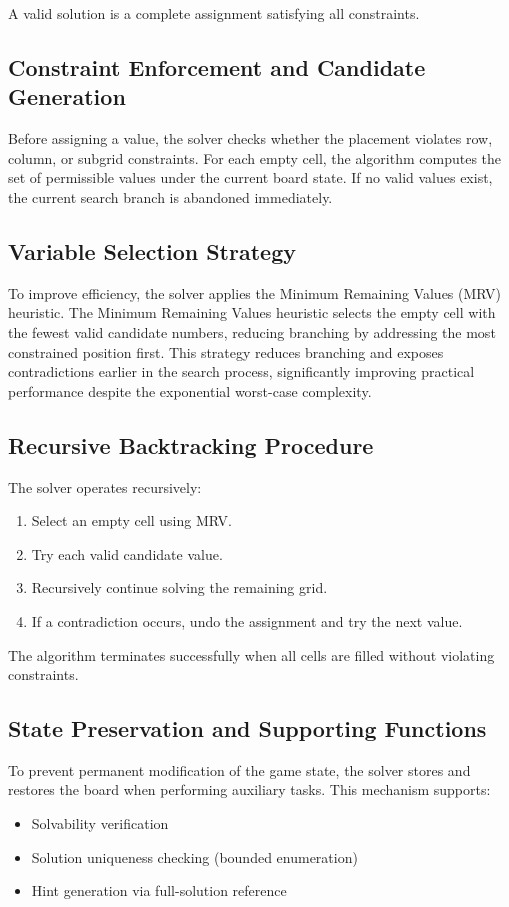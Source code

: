 \documentclass[12pt,a4paper]{article}
\begin{document}
A valid solution is a complete assignment satisfying all constraints.

\subsection{Constraint Enforcement and Candidate Generation}
Before assigning a value, the solver checks whether the placement violates row, column, or subgrid constraints. For each empty cell, the algorithm computes the set of permissible values under the current board state. If no valid values exist, the current search branch is abandoned immediately.

\subsection{Variable Selection Strategy}
To improve efficiency, the solver applies the Minimum Remaining Values (MRV) heuristic. The Minimum Remaining Values heuristic selects the empty cell with the fewest valid candidate numbers, reducing branching by addressing the most constrained position first. This strategy reduces branching and exposes contradictions earlier in the search process, significantly improving practical performance despite the exponential worst-case complexity.

\subsection{Recursive Backtracking Procedure}
The solver operates recursively:
\begin{enumerate}
    \item Select an empty cell using MRV.
    \item Try each valid candidate value.
    \item Recursively continue solving the remaining grid.
    \item If a contradiction occurs, undo the assignment and try the next value.
\end{enumerate}

The algorithm terminates successfully when all cells are filled without violating constraints.

\subsection{State Preservation and Supporting Functions}
To prevent permanent modification of the game state, the solver stores and restores the board when performing auxiliary tasks. This mechanism supports:
\begin{itemize}
    \item Solvability verification
    \item Solution uniqueness checking (bounded enumeration)
    \item Hint generation via full-solution reference
\end{itemize}
\end{document}
